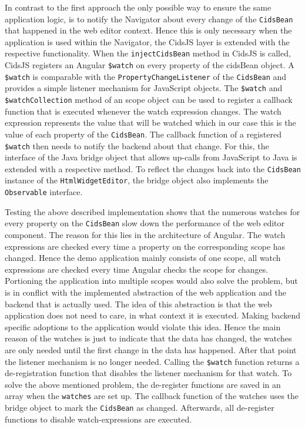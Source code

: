 In contrast to the first approach the only possible way to ensure the same application logic, is to notify the Navigator about every change of the \texttt{CidsBean} that happened in the web editor context.
Hence this is only necessary when the application is used within the Navigator, the CidsJS layer is extended with the respective functionality.
When the \texttt{injectCidsBean} method in CidsJS is called, CidsJS registers an Angular \texttt{\$watch} on every property of the cidsBean object.
A \texttt{\$watch} is comparable with the \texttt{PropertyChangeListener} of the \texttt{CidsBean} and provides a simple listener mechanism for JavaScript objects.
The \texttt{\$watch} and \texttt{\$watchCollection} method of an scope object can be used to register a callback function that is executed whenever the watch expression changes.
The watch expression represents the value that will be watched which in our case this is the value of each property of the \texttt{CidsBean}.
The callback function of a registered  \texttt{\$watch} then needs to notify the backend about that change.
For this, the interface of the Java bridge object that allows up-calls from JavaScript to Java is extended with a respective method.
To reflect the changes back into the \texttt{CidsBean} instance of the \texttt{HtmlWidgetEditor}, the bridge object also implements the \texttt{Observable} interface.

Testing the above described implementation shows that the numerous watches for every property on the \texttt{CidsBean} slow down the performance of the web editor component.
The reason for this lies in the architecture of Angular.
The watch expressions are checked every time a property on the corresponding scope has changed.
Hence the demo application mainly consists of one scope, all watch expressions are checked every time Angular checks the scope for changes.
Portioning the application into multiple scopes would also solve the problem, but is in conflict with the implemented abstraction of the web application and the backend that is actually used.
The idea of this abstraction is that the web application does not need to care, in what context it is executed. Making backend specific adoptions to the application would violate this idea.
Hence the main reason of the watches is just to indicate that the data has changed, the watches are only needed until the first change in the data has happened. 
After that point the listener mechanism is no longer needed. 
Calling the \texttt{\$watch} function returns a de-registration function that disables the listener mechanism for that watch.
To solve the above mentioned problem, the de-register functions are saved in an array when the \texttt{watches} are set up. The callback function of the watches uses the bridge object to mark the \texttt{CidsBean} as changed. Afterwards, all de-register functions to disable watch-expressions are executed. 

